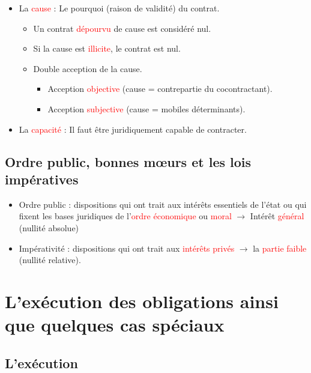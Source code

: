 \begin{itemize}
\begin{itemize}
	\end{itemize}
	\item La \textcolor{red}{cause} : Le pourquoi (raison de validité) du contrat.
	\begin{itemize}
		\item Un contrat \textcolor{red}{dépourvu} de cause est considéré nul.
		\item Si la cause est \textcolor{red}{illicite}, le contrat est nul.
		\item Double acception de la cause.
		\begin{itemize}
			\item Acception \textcolor{red}{objective} (cause = contrepartie du cocontractant).
			\item Acception \textcolor{red}{subjective} (cause = mobiles déterminants).
		\end{itemize}
	\end{itemize}
	\item La \textcolor{red}{capacité} : Il faut être juridiquement capable de contracter.
\end{itemize}

\subsection{Ordre public, bonnes mœurs et les lois impératives}

\begin{itemize}
	\item Ordre public : dispositions qui ont trait aux intérêts essentiels de l'état ou qui fixent les bases juridiques de l'\textcolor{red}{ordre économique} ou \textcolor{red}{moral} $\rightarrow$ Intérêt \textcolor{red}{général} (nullité absolue)
	\item Impérativité : dispositions qui ont trait aux \textcolor{red}{intérêts privés} $\rightarrow$ la \textcolor{red}{partie faible} (nullité relative).
\end{itemize}

\section{L'exécution des obligations ainsi que quelques cas spéciaux}

\subsection{L'exécution}

